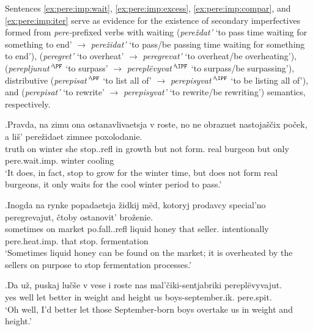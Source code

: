 Sentences \ref{ex:pere:imp:wait}, \ref{ex:pere:imp:excess}, \ref{ex:pere:imp:compar}, and \ref{ex:pere:imp:iter} serve as evidence for the existence of secondary imperfectives formed from \textit{pere-}prefixed verbs with waiting (\textit{pere\v{z}dat'} `to pass time waiting for something to end' $\rightarrow$ \textit{pere\v{z}idat'}  `to pass/be passing time waiting for something to end'),  (\textit{peregret'} `to overheat' $\rightarrow$ \textit{peregrevat'} `to overheat/be overheating'),  (\textit{perepljunut'$^{\PF}$} `to surpass' $\rightarrow$ \textit{perepl\"{e}vyvat'$^{\IPF}$} `to surpass/be surpassing'), distributive (\textit{perepisat'$^{\PF}$} `to list all of' $\rightarrow$ \textit{perepisyvat'$^{\IPF}$} `to be listing all of'), and  (\textit{perepisat'} `to rewrite' $\rightarrow$ \textit{perepisyvat'} `to rewrite/be rewriting') semantics, respectively.

\exg.\label{ex:pere:imp:wait}Pravda, na zimu ona ostanavlivaetsja v roste, no ne obrazuet nastoja\v{s}\v{c}ix po\v{c}ek, a li\v{s}' pere\v{z}idaet zimnee poxolodanie.\\
truth on winter she stop..refl in growth but not form. real burgeon but only pere.wait.imp. winter cooling\\
\trans `It does, in fact, stop to grow for the winter time, but does not form real burgeons, it only waits for the cool winter period to pass.'\\

\exg.\label{ex:pere:imp:excess}Inogda na rynke popadaetsja \v{z}idkij m\"{e}d, kotoryj prodavcy special'no peregrevajut, \v{c}toby ostanovit' bro\v{z}enie.\\
sometimes on market po.fall..refl liquid honey that seller. intentionally pere.heat.imp. that stop. fermentation\\
`Sometimes liquid honey can be found on the market; it is overheated by the sellers on purpose to stop fermentation processes.'\\

\exg.\label{ex:pere:imp:compar}Da u\v{z}, puskaj lu\v{c}\v{s}e v vese i roste nas mal'\v{c}iki-sentjabriki perepl\"{e}vyvajut.\\
yes well let better in weight and height us boys-september.ik. pere.spit.\\
\trans `Oh well, I'd better let those September-born boys overtake us in weight and height.'

